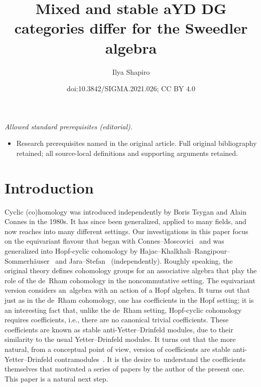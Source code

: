 \documentclass[10pt,a4paper]{amsart}
\title{Mixed and stable aYD DG categories differ for the Sweedler algebra}
\author{Ilya Shapiro}
\date{doi:10.3842/SIGMA.2021.026; CC BY 4.0}
\numberwithin{equation}{section}
\begin{document}
\maketitle
\noindent\textit{Allowed standard prerequisites (editorial).}\begin{itemize}
\item Research prerequisites named in the original article. Full original bibliography retained; all source-local definitions and supporting arguments retained.
\end{itemize}\medskip
\section{Introduction}

Cyclic (co)homology was introduced independently by Boris Tsygan and Alain Connes in the 1980s. It has since been generalized, applied to many fields, and now reaches into many different settings. Our investigations in this paper focus on the equivariant flavour that began with Connes--Moscovici~\cite{conmos} and was generalized into Hopf-cyclic cohomology by Hajac--Khalkhali--Rangipour--Sommerh\"{a}user~\cite{HKRS1, HKRS2} and Jara--Stefan~\cite{JS} (independently). Roughly speaking, the original theory defines cohomology groups for an associative algebra that play the role of the de~Rham cohomology in the noncommutative setting. The equivariant version considers an~alge\-bra with an action of a Hopf alge\-bra. It turns out that just as in the de~Rham cohomology, one has coefficients in the Hopf setting; it is an interesting fact that, unlike the de~Rham setting, Hopf-cyclic cohomology requires coefficients, i.e., there are no canonical trivial coefficients. These coefficients are known as stable anti-Yetter--Drinfeld modules, due to their similarity to the usual Yetter--Drinfeld modules. It turns out that the more natural, from a conceptual point of view, version of coefficients are stable anti-Yetter--Drinfeld contramodules~\cite{contra}. It is the desire to~under\-stand the coefficients themselves that motivated a series of papers by the author of the present one. This paper is a natural next step.
\end{document}
